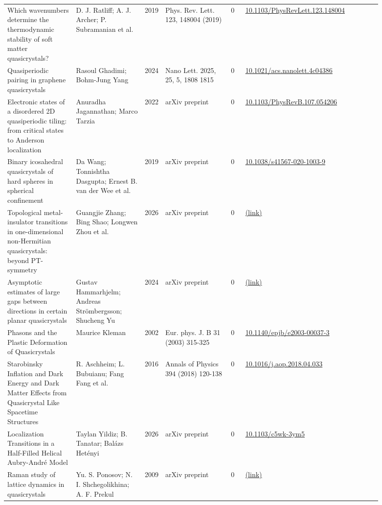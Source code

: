 \documentclass[10pt,a4paper]{article}
\begin{document}
{\begin{longtable}{p{0.192\linewidth}p{0.192\linewidth}p{0.043\linewidth}p{0.192\linewidth}p{0.043\linewidth}p{0.132\linewidth}p{0.096\linewidth}}
Which wavenumbers determine the thermodynamic stability of soft matter quasicrystals? & D. J. Ratliff; A. J. Archer; P. Subramanian et al. & 2019 & Phys. Rev. Lett. 123, 148004 (2019) & 0 & \href{https://doi.org/10.1103/PhysRevLett.123.148004}{10.1103/PhysRevLett.123.148004} &  \\
Quasiperiodic pairing in graphene quasicrystals & Rasoul Ghadimi; Bohm-Jung Yang & 2024 & Nano Lett. 2025, 25, 5, 1808 1815 & 0 & \href{https://doi.org/10.1021/acs.nanolett.4c04386}{10.1021/acs.nanolett.4c04386} &  \\
Electronic states of a disordered 2D quasiperiodic tiling: from critical states to Anderson localization & Anuradha Jagannathan; Marco Tarzia & 2022 & arXiv preprint & 0 & \href{https://doi.org/10.1103/PhysRevB.107.054206}{10.1103/PhysRevB.107.054206} &  \\
Binary icosahedral quasicrystals of hard spheres in spherical confinement & Da Wang; Tonnishtha Dasgupta; Ernest B. van der Wee et al. & 2019 & arXiv preprint & 0 & \href{https://doi.org/10.1038/s41567-020-1003-9}{10.1038/s41567-020-1003-9} &  \\
Topological metal-insulator transitions in one-dimensional non-Hermitian quasicrystals: beyond PT-symmetry & Guangjie Zhang; Bing Shao; Longwen Zhou et al. & 2026 & arXiv preprint & 0 & \href{http://arxiv.org/abs/2605.25072v1}{(link)} &  \\
Asymptotic estimates of large gaps between directions in certain planar quasicrystals & Gustav Hammarhjelm; Andreas Strömbergsson; Shucheng Yu & 2024 & arXiv preprint & 0 & \href{http://arxiv.org/abs/2409.19514v2}{(link)} &  \\
Phasons and the Plastic Deformation of Quasicrystals & Maurice Kleman & 2002 & Eur. phys. J. B 31 (2003) 315-325 & 0 & \href{https://doi.org/10.1140/epjb/e2003-00037-3}{10.1140/epjb/e2003-00037-3} &  \\
Starobinsky Inflation and Dark Energy and Dark Matter Effects from Quasicrystal Like Spacetime Structures & R. Aschheim; L. Bubuianu; Fang Fang et al. & 2016 & Annals of Physics 394 (2018) 120-138 & 0 & \href{https://doi.org/10.1016/j.aop.2018.04.033}{10.1016/j.aop.2018.04.033} &  \\
Localization Transitions in a Half-Filled Helical Aubry-André Model & Taylan Yildiz; B. Tanatar; Balázs Hetényi & 2026 & arXiv preprint & 0 & \href{https://doi.org/10.1103/c5wk-3ym5}{10.1103/c5wk-3ym5} &  \\
Raman study of lattice dynamics in quasicrystals & Yu. S. Ponosov; N. I. Shchegolikhina; A. F. Prekul & 2009 & arXiv preprint & 0 & \href{http://arxiv.org/abs/0908.4535v1}{(link)} &  \\

\end{longtable}}
\end{document}
